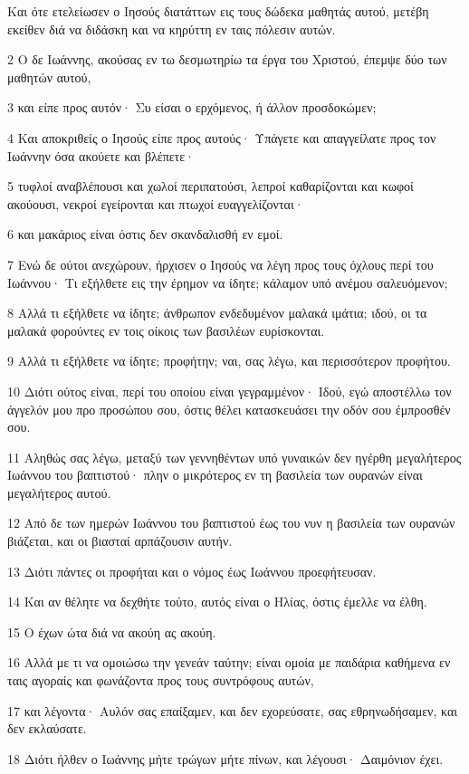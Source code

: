 \par Και ότε ετελείωσεν ο Ιησούς διατάττων εις τους δώδεκα μαθητάς αυτού, μετέβη εκείθεν διά να διδάσκη και να κηρύττη εν ταις πόλεσιν αυτών.
\par 2 Ο δε Ιωάννης, ακούσας εν τω δεσμωτηρίω τα έργα του Χριστού, έπεμψε δύο των μαθητών αυτού,
\par 3 και είπε προς αυτόν· Συ είσαι ο ερχόμενος, ή άλλον προσδοκώμεν;
\par 4 Και αποκριθείς ο Ιησούς είπε προς αυτούς· Υπάγετε και απαγγείλατε προς τον Ιωάννην όσα ακούετε και βλέπετε·
\par 5 τυφλοί αναβλέπουσι και χωλοί περιπατούσι, λεπροί καθαρίζονται και κωφοί ακούουσι, νεκροί εγείρονται και πτωχοί ευαγγελίζονται·
\par 6 και μακάριος είναι όστις δεν σκανδαλισθή εν εμοί.
\par 7 Ενώ δε ούτοι ανεχώρουν, ήρχισεν ο Ιησούς να λέγη προς τους όχλους περί του Ιωάννου· Τι εξήλθετε εις την έρημον να ίδητε; κάλαμον υπό ανέμου σαλευόμενον;
\par 8 Αλλά τι εξήλθετε να ίδητε; άνθρωπον ενδεδυμένον μαλακά ιμάτια; ιδού, οι τα μαλακά φορούντες εν τοις οίκοις των βασιλέων ευρίσκονται.
\par 9 Αλλά τι εξήλθετε να ίδητε; προφήτην; ναι, σας λέγω, και περισσότερον προφήτου.
\par 10 Διότι ούτος είναι, περί του οποίου είναι γεγραμμένον· Ιδού, εγώ αποστέλλω τον άγγελόν μου προ προσώπου σου, όστις θέλει κατασκευάσει την οδόν σου έμπροσθέν σου.
\par 11 Αληθώς σας λέγω, μεταξύ των γεννηθέντων υπό γυναικών δεν ηγέρθη μεγαλήτερος Ιωάννου του βαπτιστού· πλην ο μικρότερος εν τη βασιλεία των ουρανών είναι μεγαλήτερος αυτού.
\par 12 Από δε των ημερών Ιωάννου του βαπτιστού έως του νυν η βασιλεία των ουρανών βιάζεται, και οι βιασταί αρπάζουσιν αυτήν.
\par 13 Διότι πάντες οι προφήται και ο νόμος έως Ιωάννου προεφήτευσαν.
\par 14 Και αν θέλητε να δεχθήτε τούτο, αυτός είναι ο Ηλίας, όστις έμελλε να έλθη.
\par 15 Ο έχων ώτα διά να ακούη ας ακούη.
\par 16 Αλλά με τι να ομοιώσω την γενεάν ταύτην; είναι ομοία με παιδάρια καθήμενα εν ταις αγοραίς και φωνάζοντα προς τους συντρόφους αυτών,
\par 17 και λέγοντα· Αυλόν σας επαίξαμεν, και δεν εχορεύσατε, σας εθρηνωδήσαμεν, και δεν εκλαύσατε.
\par 18 Διότι ήλθεν ο Ιωάννης μήτε τρώγων μήτε πίνων, και λέγουσι· Δαιμόνιον έχει.
